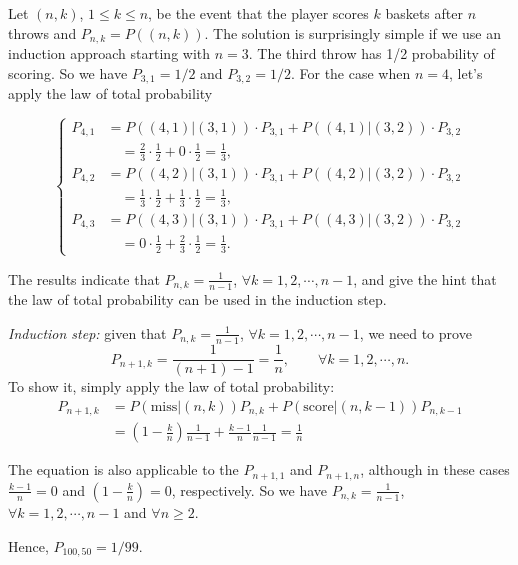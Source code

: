 \begin{solution}
Let \((n,k)\), \(1\le k\le n\), be the event that the player scores \(k\) baskets after \(n\) throws and \(P_{n,k}=P((n,k))\). The solution is surprisingly simple if we use an induction approach starting with \(n=3\). The third throw has 1/2 probability of scoring. So we have \(P_{3,1}=1/2\) and \(P_{3,2}=1/2\). For the case when \(n=4\), let's apply the law of total probability

\[
\left\{
\begin{aligned}
P_{4,1}&=P((4,1)\vert(3,1))\cdot P_{3,1}+P((4,1)\vert(3,2))\cdot P_{3,2}\\
&\quad=\frac{2}{3}\cdot\frac{1}{2}+0\cdot\frac{1}{2}=\frac{1}{3},\\
P_{4,2}&=P((4,2)\vert(3,1))\cdot P_{3,1}+P((4,2)\vert(3,2))\cdot P_{3,2}\\
&\quad=\frac{1}{3}\cdot\frac{1}{2}+\frac{1}{3}\cdot\frac{1}{2}=\frac{1}{3},\\
P_{4,3}&=P((4,3)\vert(3,1))\cdot P_{3,1}+P((4,3)\vert(3,2))\cdot P_{3,2}\\
&\quad=0\cdot\frac{1}{2}+\frac{2}{3}\cdot\frac{1}{2}=\frac{1}{3}.
\end{aligned}
\right.
\]

The results indicate that \(P_{n,k}=\frac{1}{n-1}\), \(\forall k=1,2,\cdots,n-1\), and give the hint that the law of total probability can be used in the induction step.

\emph{Induction step:} given that \(P_{n,k}=\frac{1}{n-1}\), \(\forall k=1,2,\cdots,n-1\), we need to prove
\[
P_{n+1,k}=\frac{1}{(n+1)-1}=\frac{1}{n},\qquad \forall k=1,2,\cdots,n.
\]
To show it, simply apply the law of total probability:
\[
\begin{aligned}
P_{n+1,k}&=P(\text{miss}\vert(n,k))P_{n,k}+P(\text{score}\vert(n,k-1))P_{n,k-1}\\
&=\left(1-\frac{k}{n}\right)\frac{1}{n-1}+\frac{k-1}{n}\frac{1}{n-1}=\frac{1}{n}
\end{aligned}
\]

The equation is also applicable to the \(P_{n+1,1}\) and \(P_{n+1,n}\), although in these cases \(\frac{k-1}{n}=0\) and \(\left(1-\frac{k}{n}\right)=0\), respectively. So we have \(P_{n,k}=\frac{1}{n-1}\), \(\forall k=1,2,\cdots,n-1\) and \(\forall n\ge2\).

Hence, \(P_{100,50}=1/99\).
\end{solution}

